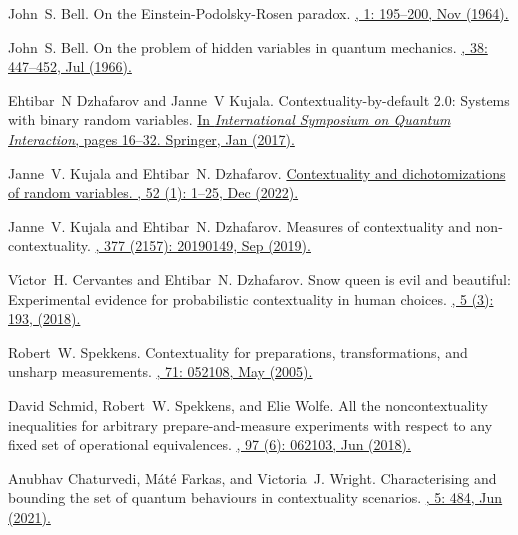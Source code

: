\documentclass[a4paper,twocolumn,11pt,accepted=2024-01-17]{quantumarticle}
\begin{document}
\begin{thebibliography}{100}
John~S. Bell.
\newblock On the {E}instein-{P}odolsky-{R}osen paradox.
\href{https://journals.aps.org/ppf/pdf/10.1103/PhysicsPhysiqueFizika.1.195}{, 1: 195--200, Nov (1964).}

John~S. Bell.
\newblock On the problem of hidden variables in quantum mechanics.
\href{https://doi.org/10.1103/RevModPhys.38.447}{, 38: 447--452, Jul (1966).}

Ehtibar~N Dzhafarov and Janne~V Kujala.
\newblock Contextuality-by-default 2.0: Systems with binary random variables.
\href{https://doi.org/10.1007/978-3-319-52289-0_2}{\newblock In {\em International Symposium on Quantum Interaction}, pages 16--32. Springer, Jan (2017).}

Janne~V. Kujala and Ehtibar~N. Dzhafarov.
\href{https://doi.org/10.1007/s10701-021-00527-9}{\newblock Contextuality and dichotomizations of random variables.
, 52 (1): 1--25, Dec (2022).}

Janne~V. Kujala and Ehtibar~N. Dzhafarov.
\newblock Measures of contextuality and non-contextuality.
\href{https://doi.org/10.1098/rsta.2019.0149}{,
  377 (2157): 20190149, Sep (2019).}

V{\'\i}ctor~H. Cervantes and Ehtibar~N. Dzhafarov.
\newblock Snow queen is evil and beautiful: {E}xperimental evidence for
  probabilistic contextuality in human choices.
\href{https://psycnet.apa.org/doi/10.1037/dec0000095}{, 5 (3): 193, (2018).}

Robert~W. Spekkens.
\newblock Contextuality for preparations, transformations, and unsharp measurements.
\href{https://doi.org/10.1103/PhysRevA.71.052108}{, 71: 052108, May (2005).}

David Schmid, Robert~W. Spekkens, and Elie Wolfe.
\newblock All the noncontextuality inequalities for arbitrary prepare-and-measure experiments with respect to any fixed set of operational equivalences.
\href{https://doi.org/10.1103/PhysRevA.97.062103}{, 97 (6): 062103, Jun (2018).}

Anubhav Chaturvedi, M{\'a}t{\'e} Farkas, and Victoria~J. Wright.
\newblock Characterising and bounding the set of quantum behaviours in contextuality scenarios.
\href{https://doi.org/10.22331/q-2021-06-29-484}{, 5: 484, Jun (2021).}


\end{thebibliography}
\end{document}
